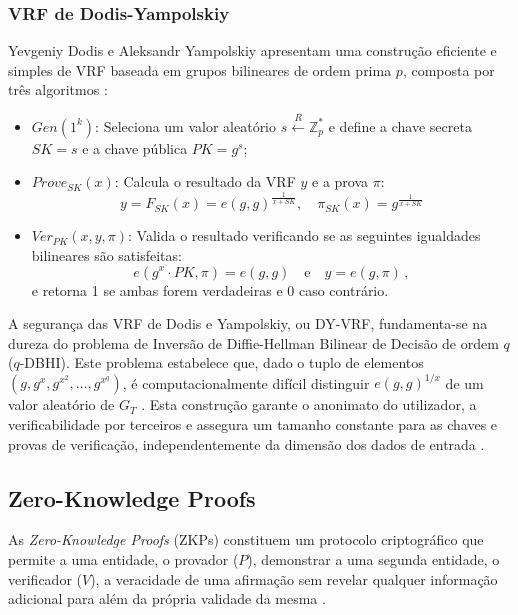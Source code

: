 \subsubsection{VRF de Dodis-Yampolskiy}
\label{ssec:dy_vrf}

Yevgeniy Dodis e Aleksandr Yampolskiy apresentam uma construção eficiente e simples de VRF baseada em grupos bilineares de ordem prima $p$, composta por três algoritmos \cite{dodis2005verifiable}:

\begin{itemize}
    \item $Gen(1^k)$: Seleciona um valor aleatório $s \xleftarrow{R} \mathbb{Z}_p^*$ e define a chave secreta $SK = s$ e a chave pública $PK = g^s$;
    \item $Prove_{SK}(x)$: Calcula o resultado da VRF $y$ e a prova $\pi$:
    \begin{equation*}
        y = F_{SK}(x) = e(g,g)^{\frac{1}{x+SK}}, \quad \pi_{SK}(x) = g^{\frac{1}{x+SK}}
    \end{equation*}
    \item $Ver_{PK}(x,y,\pi)$: Valida o resultado verificando se as seguintes igualdades bilineares são satisfeitas:
    \begin{equation*}
        e(g^x \cdot PK, \pi) = e(g,g) \quad \text{e} \quad y = e(g, \pi) \, ,
    \end{equation*}
    e retorna 1 se ambas forem verdadeiras e 0 caso contrário.
\end{itemize}

A segurança das VRF de Dodis e Yampolskiy, ou DY-VRF, fundamenta-se na dureza do problema de Inversão de Diffie-Hellman Bilinear de Decisão de ordem $q$ ($q$-DBHI). Este problema estabelece que, dado o tuplo de elementos $(g, g^x, g^{x^2}, \ldots, g^{x^q})$, é computacionalmente difícil distinguir $e(g,g)^{1/x}$ de um valor aleatório de $G_T$ \cite{crites2025syra}. Esta construção garante o anonimato do utilizador, a verificabilidade por terceiros \cite{crites2025syra} e assegura um tamanho constante para as chaves e provas de verificação, independentemente da dimensão dos dados de entrada \cite{dodis2005verifiable}.

\subsection{Zero-Knowledge Proofs}

As \textit{Zero-Knowledge Proofs} (ZKPs) constituem um protocolo criptográfico que permite a uma entidade, o provador ($P$), demonstrar a uma segunda entidade, o verificador ($V$), a veracidade de uma afirmação sem revelar qualquer informação adicional para além da própria validade da mesma \cite{mulder2023trends}.

